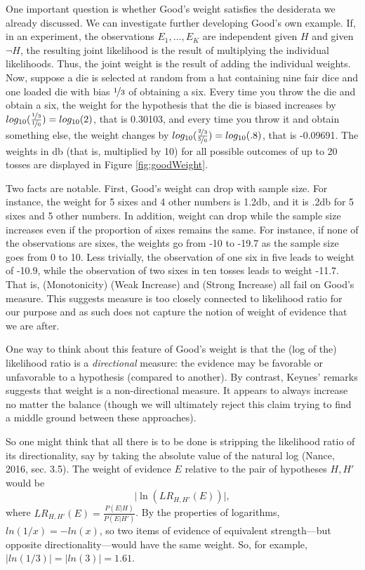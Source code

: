 \documentclass[
  10pt,
  dvipsnames,enabledeprecatedfontcommands]{scrartcl}
\begin{document}
One important question is whether Good's weight satisfies the desiderata
we already discussed. We can investigate further developing Good's own
example. If, in an experiment, the observations \(E_1, \dots, E_K\) are
independent given \(H\) and given \(\neg H\), the resulting joint
likelihood is the result of multiplying the individual likelihoods.
Thus, the joint weight is the result of adding the individual weights.
Now, suppose a die is selected at random from a hat containing nine fair
dice and one loaded die with bias \(\nicefrac{1}{3}\) of obtaining a
six. Every time you throw the die and obtain a six, the weight for the
hypothesis that the die is biased increases by
\(log_{10}(\frac{\nicefrac{1}{3}}{\nicefrac{1}{6}})= log_{10}(2)\), that
is 0.30103, and every time you throw it and obtain something else, the
weight changes by
\(log_{10}(\frac{\nicefrac{2}{3}}{\nicefrac{5}{6}})= log_{10}(.8)\),
that is -0.09691. The weights in db (that is, multiplied by 10) for all
possible outcomes of up to 20 tosses are displayed in Figure
\ref{fig:goodWeight}.

Two facts are notable. First, Good's weight can drop with sample size.
For instance, the weight for 5 sixes and 4 other numbers is 1.2db, and
it is .2db for 5 sixes and 5 other numbers. In addition, weight can drop
while the sample size increases even if the proportion of sixes remains
the same. For instance, if none of the observations are sixes, the
weights go from -10 to -19.7 as the sample size goes from 0 to 10. Less
trivially, the observation of one six in five leads to weight of -10.9,
while the observation of two sixes in ten tosses leads to weight -11.7.
That is, (Monotonicity) (Weak Increase) and (Strong Increase) all fail
on Good's measure. This suggests measure is too closely connected to
likelihood ratio for our purpose and as such does not capture the notion
of weight of evidence that we are after.

One way to think about this feature of Good's weight is that the (log of
the) likelihood ratio is a \emph{directional} measure: the evidence may
be favorable or unfavorable to a hypothesis (compared to another). By
contrast, Keynes' remarks suggests that weight is a non-directional
measure. It appears to always increase no matter the balance (though we
will ultimately reject this claim trying to find a middle ground between
these approaches).

So one might think that all there is to be done is stripping the
likelihood ratio of its directionality, say by taking the absolute value
of the natural log (Nance, 2016, sec. 3.5). The weight of evidence \(E\)
relative to the pair of hypotheses \(H, H'\) would be
\[\vert \ln (LR_{H, H'}(E)) \vert, \] where
\(LR_{H, H'}(E)=\frac{P(E \vert H)}{P(E \vert H')}\). By the properties
of logarithms, \(ln(1/x) = -ln(x)\), so two items of evidence of
equivalent strength---but opposite directionality---would have the same
weight. So, for example, \(|ln(1/3)|= |ln(3)| = 1.61\).
\end{document}
